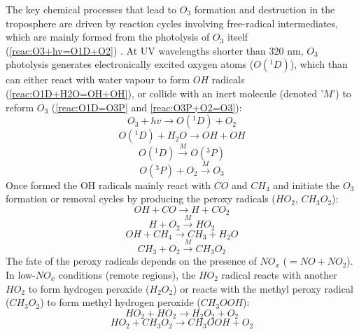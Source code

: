 \documentclass[11pt,a4paper]{article}
\begin{document}
The key chemical processes that lead to $O_3$ formation and destruction in the troposphere are driven by reaction cycles involving free-radical intermediates, which are mainly formed from the photolysis of $O_3$ itself (\ref{reac:O3+hv=O1D+O2}) \citep{Fowler2008}. At UV wavelengths shorter than 320 nm, $O_3$ photolysis generates electronically excited oxygen atoms ($O(^1D)$), which than can either react with water vapour to form $OH$ radicals (\ref{reac:O1D+H2O=OH+OH}), or collide with an inert molecule (denoted '$M$') to reform $O_3$ (\ref{reac:O1D=O3P} and \ref{reac:O3P+O2=O3}):
\begin{equation}\label{reac:O3+hv=O1D+O2}
O_3 + hv \rightarrow O(^1D) + O_2
\end{equation}
\begin{equation}\label{reac:O1D+H2O=OH+OH}
O(^1D) + H_2O \rightarrow OH + OH
\end{equation}
\begin{equation}\label{reac:O1D=O3P}
O(^1D) \xrightarrow{M} O(^3P)
\end{equation}
\begin{equation}\label{reac:O3P+O2=O3}
O(^3P) + O_2 \xrightarrow{M} O_3
\end{equation}
Once formed the OH radicals mainly react with $CO$ and $CH_4$ and initiate the $O_3$ formation or removal cycles by producing the peroxy radicals ($HO_2$, $CH_3O_2$):
\begin{equation}\label{reac:OH+CO=H+CO2}
OH + CO \rightarrow H + CO_2
\end{equation}
\begin{equation}\label{reac:H+O2=HO2}
H + O_2 \xrightarrow{M} HO_2
\end{equation}
\begin{equation}\label{reac:OH+CH4=CH3+H2O}
OH + CH_4 \rightarrow CH_3 + H_2O
\end{equation}
\begin{equation}\label{reac:CH3O+O2=CH3O2}
CH_3 + O_2 \xrightarrow{M} CH_3O_2
\end{equation}
The fate of the peroxy radicals depends on the presence of $NO_x$ ($=NO + NO_2$). In low-$NO_x$ conditions (remote regions), the $HO_2$ radical reacts with another $HO_2$ to form hydrogen peroxide ($H_2O_2$) or reacts with the methyl peroxy radical ($CH_3O_2$) to form methyl hydrogen peroxide ($CH_3OOH$):
\begin{equation} \label{reac:HO2+HO2=H2O2+O2}
HO_2 + HO_2 \rightarrow H_2O_2 + O_2
\end{equation}
\begin{equation} \label{reac:HO2+CH3O2=CH3OOH+O2}
HO_2 + CH_3O_2 \rightarrow CH_3OOH + O_2
\end{equation}
\end{document}
